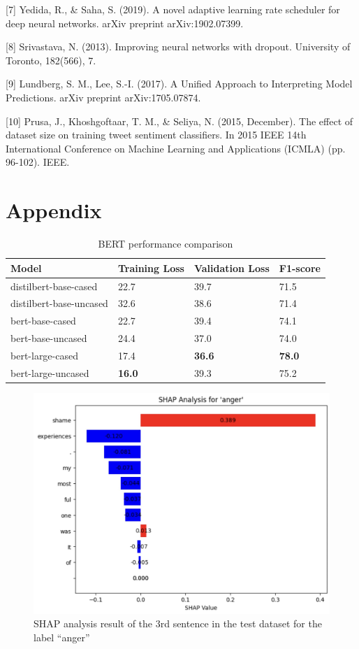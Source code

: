 \documentclass[11pt]{article}
\begin{document}
[7] Yedida, R., \& Saha, S. (2019). A novel adaptive learning rate scheduler for deep neural networks. arXiv preprint arXiv:1902.07399.

[8] Srivastava, N. (2013). Improving neural networks with dropout. University of Toronto, 182(566), 7.

[9] Lundberg, S. M., Lee, S.-I. (2017). A Unified Approach to Interpreting Model Predictions. arXiv preprint arXiv:1705.07874.

[10] Prusa, J., Khoshgoftaar, T. M., \& Seliya, N. (2015, December). The effect of dataset size on training tweet sentiment classifiers. In 2015 IEEE 14th International Conference on Machine Learning and Applications (ICMLA) (pp. 96-102). IEEE.

\clearpage
\onecolumn
\section{Appendix}

\begin{table}[htp]
\caption{BERT performance comparison}
\centering
\begin{tabular}{|l|l|l|l|}
\hline
\textbf{Model} & \textbf{Training Loss} & \textbf{Validation Loss} & \textbf{F1-score} \\ \hline
distilbert-base-cased   & 22.7 & 39.7 & 71.5 \\ \hline
distilbert-base-uncased & 32.6 & 38.6 & 71.4 \\ \hline
bert-base-cased         & 22.7 & 39.4 & 74.1 \\ \hline
bert-base-uncased       & 24.4 & 37.0 & 74.0 \\ \hline
bert-large-cased        & 17.4 & \textbf{36.6} & \textbf{78.0} \\ \hline
bert-large-uncased      & \textbf{16.0} & 39.3 & 75.2 \\ \hline
\end{tabular}
\label{tab:bert_performance}
\end{table}

\begin{figure}[htp]
    \centering
    \includegraphics[width=0.8\linewidth]{images/figure1.jpg}
    \caption{SHAP analysis result of the 3rd sentence in the test dataset for the label “anger”}
    \label{fig:figure1}
\end{figure}
\end{document}
